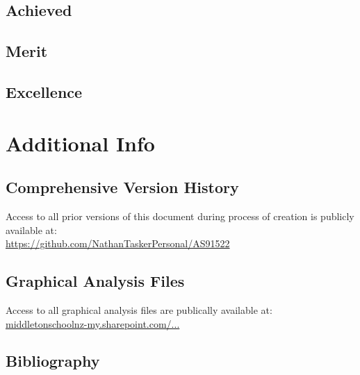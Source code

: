 \documentclass[11pt, a4paper]{article}
\begin{document}
	\subsection{Achieved}
	\subsection{Merit}
	\subsection{Excellence}
	\section{Additional Info}
	\subsection{Comprehensive Version History}
	Access to all prior versions of this document during process of creation is publicly available at:\\
	\url{https://github.com/NathanTaskerPersonal/AS91522}
	\subsection{Graphical Analysis Files}
	Access to all graphical analysis files are publically available at:\\
	\href{https://middletonschoolnz-my.sharepoint.com/:f:/g/personal/taskern_middleton_school_nz/EhEmw21C2L9Fn9BYUy2ccwMBn6xCUF93vtfvtT_5_rkxbA?e=Tp02lP}{middletonschoolnz-my.sharepoint.com/...}
	\subsection{Bibliography}
\end{document}

